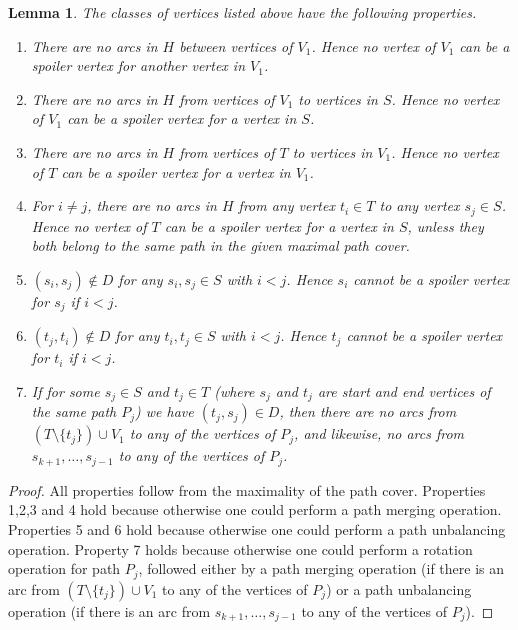 \documentclass[11pt]{article}
\numberwithin{equation}{section}
\newtheorem{lemma}[theorem]{Lemma}
\theoremstyle{definition}
\theoremstyle{plain}
\theoremstyle{plain}
\begin{document}
\begin{lemma}
	\label{lem:properties}
The classes of vertices listed above have the following properties. %
	\begin{enumerate}
		\item There are no arcs in $H$ between vertices of $V_1$. Hence no vertex of $V_1$ can be a spoiler vertex for another vertex in $V_1$.
		\item There are no arcs in $H$ from vertices of $V_1$ to vertices in $S$. Hence no vertex of $V_1$ can be a spoiler vertex for a vertex in $S$.
		\item There are no arcs in $H$ from vertices of $T$ to vertices in $V_1$. Hence no vertex of $T$ can be a spoiler vertex for a vertex in $V_1$.
		\item For $i \not= j$, there are no arcs in $H$ from any vertex $t_i\in T$ to any vertex $s_j \in S$. Hence no vertex of $T$ can be a spoiler vertex for a vertex in $S$, unless they both belong to the same path in the given maximal path cover.
		\item $(s_i,s_j) \not\in D$ for any $s_i,s_j \in S$ with $i < j$.  Hence $s_i$ cannot be a spoiler vertex for $s_j$ if $i < j$.
		\item $(t_j,t_i) \not\in D$ for any $t_i,t_j \in S$ with $i < j$.  Hence $t_j$ cannot be a spoiler vertex for $t_i$ if $i < j$.
		\item If for some $s_j \in S$ and $t_j \in T$ (where $s_j$ and $t_j$ are start and end vertices of the same path $P_j$) 
%
we have  %
$(t_j,s_j)\in D$, then there are no arcs from $(T \setminus \{t_j\}) \cup V_1$ to any of the vertices of $P_j$, and likewise, no arcs from $s_{k+1}, \ldots, s_{j-1}$ to any of the vertices of $P_j$.
	\end{enumerate}
\end{lemma}

\begin{proof}
	All properties follow from the maximality of the path cover. Properties 1,2,3 and 4 hold because otherwise one could perform a path merging operation. Properties 5 and 6 hold because otherwise one could perform a path unbalancing operation. Property 7 holds because otherwise one could perform a rotation operation for path $P_j$, followed either by a path merging operation (if there is an arc from $(T \setminus \{t_j\}) \cup V_1$ to any of the vertices of $P_j$) or a path unbalancing operation (if there is an arc from $s_{k+1}, \ldots, s_{j-1}$ to any of the vertices of $P_j$).
\end{proof}
\end{document}
